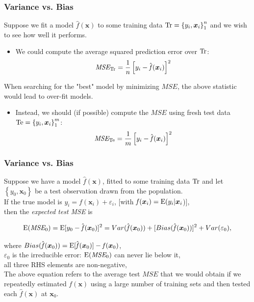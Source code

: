 \documentclass{beamer}
\begin{document}
\begin{frame}
\frametitle{Variance vs. Bias}

Suppose we fit a model $\hat{\mathit{f}}(\bm{x})$ to some training data $\textnormal{Tr}=\left\lbrace y_i, \bm{x}_i \right\rbrace _1 ^n$ and we wish to see how well it performs.

\begin{itemize}
\item We could compute the average squared prediction error over $\textnormal{Tr}$:
$$ \textit{MSE}_{\textnormal{Tr}} = \frac{1}{n}
   \left[y_i - \hat{\mathit{f}}(\bm{x}_i) \right]^2 $$
\end{itemize}

When searching for the "best" model by minimizing $ \textit{MSE}$, the above statistic would lead to over-fit models.
\vspace{0.3cm}
\begin{itemize}
\item Instead, we should (if possible) compute the $ \textit{MSE}$ using fresh test
data $\textnormal{Te}=\left\lbrace y_i, \bm{x}_i \right\rbrace _1 ^m$:
$$ \textit{MSE}_{\textnormal{Te}} = \frac{1}{m}
   \left[y_i - \hat{\mathit{f}}(\bm{x}_i) \right]^2 $$
\end{itemize}


\end{frame}

\begin{frame}
\frametitle{Variance vs. Bias}

Suppose we have a model $\hat{\mathit{f}}(\bm{x})$, fitted to some training data $\textnormal{Tr}$ and let $\left\lbrace y_0, \bm{x}_0 \right\rbrace$ be a test observation drawn from the population. \\If the true model is 
$y_i = \mathit{f}(\bm{x}_i) + \varepsilon_i$, [with $\mathit{f}(\bm{x}_i)= \textnormal{E}(y_i | \bm{x}_i $)],\\
then the \textit{expected test MSE} is

$$ \textnormal{E}(\textit{MSE}_0)
   =\textnormal{E}[y_0- \hat{\mathit{f}}(\bm{x}_0)]^2 
   = Var(\hat{\mathit{f}}(\bm{x}_0))
   + [Bias(\hat{\mathit{f}}(\bm{x}_0))]^2
   + Var(\varepsilon_0), $$

where $Bias(\hat{\mathit{f}}(\bm{x}_0)) 
       = \textnormal{E}[\hat{\mathit{f}}(\bm{x}_0)]
       - \mathit{f}(\bm{x}_0)$,
\\ \hspace{1cm} $\varepsilon_0$ is the irreducible error: $\textnormal{E}(\textit{MSE}_0)$ can never lie below it,
\\ \hspace{1cm} all three RHS elements are non-negative,
\vspace{0.5cm} 
\\The above equation refers to the average test $\textit{MSE}$ that we would obtain if we repeatedly estimated $\mathit{f}(\bm{x})$ using a large number of training sets and then tested each $\hat{\mathit{f}}(\bm{x})$ at $\bm{x}_0$.


\end{frame}
\end{document}
